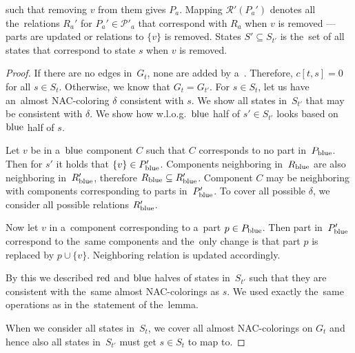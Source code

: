 such that removing \( v \) from them gives \( P_a \).
Mapping \( \mathcal{R'}(P_a') \) denotes all the~relations \( R_a' \)
for \( P_a' \in \mathcal{P'}_a \) that correspond with \( R_a \) when \( v \) is removed
--- parts are updated or relations to \( \{v\} \) is removed.
States \( S' \subseteq S_{t'} \) is the~set of all states that
correspond to state \( s \) when \( v \) is removed.
%
\begin{proof}
	If there are no edges in~\( G_t \), none are added by a~\ForgetVertexNode{}.
	Therefore, \( c[t, s] = 0 \) for all \( s \in S_t \).
	Otherwise, we know that \( G_t = G_{t'} \).
	For \( s \in S_t \),
	let us have an~almost NAC-coloring \( \delta \) consistent with \( s \).
	We show all states in~\( S_{t'} \) that may be consistent with \( \delta \).
	We show how w.l.o.g.\ \( \text{blue} \) half of \( s' \in S_{t'} \) looks
	based on \( \text{blue} \) half of \( s \).

	Let \( v \) be in a~\( \text{blue} \) component \( C \) such that
	\( C \) corresponds to no part in~\( P_{\text{blue}} \).
	Then for \( s' \) it holds that \( \{v\} \in P_{\text{blue}}' \).
	Components neighboring in~\( R_{\text{blue}} \)
	are also neighboring in~\( R_{\text{blue}}' \), therefore \( R_{\text{blue}} \subseteq R_{\text{blue}}' \).
	Component \( C \) may be neighboring with
	components corresponding to parts in~\( P_{\text{blue}}' \).
	To cover all possible \( \delta \),
	we consider all possible relations \( R_{\text{blue}}' \).

	Now let \( v \) in a~component corresponding to a~part \( p \in P_{\text{blue}} \).
	Then part in~\( P_{\text{blue}}' \) correspond to the~same components and the~only
	change is that part \( p \) is replaced by \( p \cup \{v\} \).
	Neighboring relation is updated accordingly.

	By this we described \( \text{red} \) and \( \text{blue} \) halves of states in~\( S_{t'} \)
	such that they are consistent with the~same almost NAC-colorings as \( s \).
	We used exactly the~same operations as in the~statement of the~lemma.

	When we consider all states in~\( S_t \), we cover all almost NAC-colorings on \( G_t \)
	and hence also all states in~\( S_{t'} \) must get \( s \in S_t \) to map to.


\end{proof}
